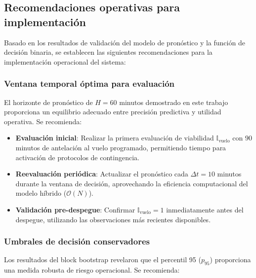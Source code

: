 \documentclass[
  spanish,
  us-letterpaper,
]{scrreprt}
\providecommand{\tightlist}{%
  \setlength{\itemsep}{0pt}\setlength{\parskip}{0pt}}
\numberwithin{equation}{section}
\begin{document}
\subsection*{Recomendaciones operativas para
implementación}\label{recomendaciones-operativas-para-implementaciuxf3n}

Basado en los resultados de validación del modelo de pronóstico y la
función de decisión binaria, se establecen las siguientes
recomendaciones para la implementación operacional del sistema:

\subsubsection*{Ventana temporal óptima para
evaluación}\label{ventana-temporal-uxf3ptima-para-evaluaciuxf3n}

El horizonte de pronóstico de \(H = 60\) minutos demostrado en este
trabajo proporciona un equilibrio adecuado entre precisión predictiva y
utilidad operativa. Se recomienda:

\begin{itemize}
\tightlist
\item
  \textbf{Evaluación inicial}: Realizar la primera evaluación de
  viabilidad \(\mathbb{I}_{\text{vuelo}}\) con \(90\) minutos de
  antelación al vuelo programado, permitiendo tiempo para activación de
  protocolos de contingencia.
\item
  \textbf{Reevaluación periódica}: Actualizar el pronóstico cada
  \(\Delta t = 10\) minutos durante la ventana de decisión, aprovechando
  la eficiencia computacional del modelo híbrido (\(\mathcal{O}(N)\)).
\item
  \textbf{Validación pre-despegue}: Confirmar
  \(\mathbb{I}_{\text{vuelo}} = 1\) inmediatamente antes del despegue,
  utilizando las observaciones más recientes disponibles.
\end{itemize}

\subsubsection*{Umbrales de decisión
conservadores}\label{umbrales-de-decisiuxf3n-conservadores}

Los resultados del block bootstrap revelaron que el percentil 95
(\(p_{95}\)) proporciona una medida robusta de riesgo operacional. Se
recomienda:
\end{document}
